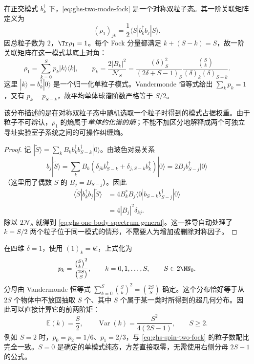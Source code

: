 \begin{proposition}[单体约化谱]
在正交模式 $b_k^\dagger$ 下，\cref{eq:ghs-two-mode-fock} 是一个对称双粒子态。其一阶关联矩阵定义为
\begin{equation}\label{eq:ghs-one-body-density-definition}
 (\rho_1)_{jk}=\frac12\langle S|b_k^\dagger b_j|S\rangle.
\end{equation}
因总粒子数为 $2$，$\Tr\rho_1=1$。每个 Fock 分量都满足 $k+(S-k)=S$，故一阶关联矩阵在这一模式基底上对角：
\begin{equation}\label{eq:ghs-one-body-spectrum-general}
 \rho_1=\sum_{k=0}^S p_k|k\rangle\langle k|,\qquad
 p_k=\frac{2|B_k|^2}{\mathcal N_S}
 =\frac{(\delta)_S^2}{(2\delta+S-1)_S}
 \frac{\binom Sk}{(\delta)_k(\delta)_{S-k}}.
\end{equation}
这里 $|k\rangle=b_k^\dagger|0\rangle$ 是一个归一化单粒子模式。Vandermonde 恒等式给出 $\sum_kp_k=1$，又有 $p_k=p_{S-k}$，故平均单体球谐阶数严格等于 $S/2$。

该分布描述的是在对称双粒子态中随机选取一个粒子时得到的模式占据权重。由于粒子不可辨认，$\rho_1$ 的熵属于\emph{单体约化谱的熵}；不能不加区分地解释成两个可独立寻址实验室子系统之间的可操作纠缠熵。
\end{proposition}

\begin{proof}
记 $|\widetilde S\rangle=\sum_kB_kb_k^\dagger b_{S-k}^\dagger|0\rangle$。由玻色对易关系
\begin{equation*}
b_j|\widetilde S\rangle
=\sum_kB_k(\delta_{jk}b_{S-k}^\dagger+\delta_{j,S-k}b_k^\dagger)|0\rangle
=2B_jb_{S-j}^\dagger|0\rangle
\end{equation*}
（这里用了偶数 $S$ 的 $B_j=B_{S-j}$）。因此
\begin{align*}
\langle\widetilde S|b_k^\dagger b_j|\widetilde S\rangle
&=4B_k^*B_j\langle0|b_{S-k}b_{S-j}^\dagger|0\rangle\\
&=4|B_j|^2\delta_{kj}.
\end{align*}
除以 $2\mathcal N_S$ 就得到 \cref{eq:ghs-one-body-spectrum-general}。这一推导自动处理了 $k=S/2$ 两个粒子位于同一模式的情形，不需要人为增加或删除对称因子。
\end{proof}

\begin{example}[四维模式谱与超几何分布]
在四维 $\delta=1$，使用 $(1)_k=k!$，上式化为
\begin{equation}\label{eq:ghs-hypergeometric-mode-distribution}
 p_k=\frac{\binom Sk^2}{\binom{2S}{S}},\qquad
 k=0,1,\ldots,S,\qquad S\in2\NN_0.
\end{equation}
分母由 Vandermonde 恒等式 $\sum_{k=0}^S\binom Sk^2=\binom{2S}{S}$ 确定。这个分布恰好等于从 $2S$ 个物体中不放回抽取 $S$ 个、其中 $S$ 个属于某一类时所得到的超几何分布。因此可以直接计算它的前两阶矩：
\begin{equation}\label{eq:ghs-mode-variance}
 \mathbb E(k)=\frac S2,\qquad
 \operatorname{Var}(k)=\frac{S^2}{4(2S-1)},\qquad S\ge2.
\end{equation}
例如 $S=2$ 时，$p_0=p_2=1/6$、$p_1=2/3$，与 \cref{eq:ghs-spin-two-fock} 的粒子数配比完全一致。$S=0$ 是确定的单模式纯态，方差直接取零，无需使用右侧分母 $2S-1$ 的公式。
\end{example}

